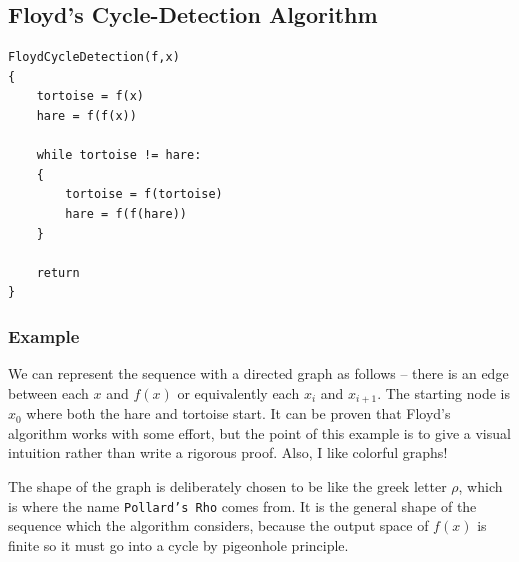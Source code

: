 \subsection{Floyd's Cycle-Detection Algorithm}
\begin{center}
\begin{minipage}{0.9\linewidth}
\begin{framed}
\begin{Verbatim}
FloydCycleDetection(f,x)
{
    tortoise = f(x)
    hare = f(f(x))

    while tortoise != hare:
    {
        tortoise = f(tortoise)
        hare = f(f(hare))
    }

    return 
}
\end{Verbatim}
\vspace{-4mm}
\end{framed}
\end{minipage}
\end{center}

\subsubsection*{Example}
We can represent the sequence with a directed graph as follows -- there is an edge between each $x$ and $f(x)$ or 
equivalently each $x_i$ and $x_{i+1}$. The starting node 
is $x_0$ where both the hare and tortoise start. It can be proven that 
Floyd's algorithm works with some effort, but the point of this example is to give a 
visual intuition rather than write a rigorous proof. Also, I like colorful graphs!

The shape of the graph is deliberately chosen to be like the greek letter $\rho$, which is 
where the name \texttt{Pollard's Rho} comes from. It is the general shape of the 
sequence which the algorithm considers, because the output space of $f(x)$ is finite so it must 
go into a cycle by pigeonhole principle.
\begin{center}
\end {center}

